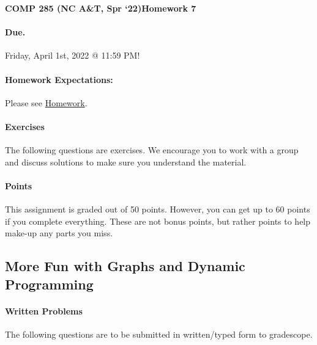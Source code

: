 \documentclass [12pt]{article}
\begin{document}
 

{\LARGE \textbf {COMP 285 (NC A\&T, Spr `22)}\hfill \textbf {Homework 7} } 
\vspace {1em} 
\begin{Instruction} 

\paragraph {Due.} Friday, April 1st, 2022 @ 11:59 PM!
\end{Instruction} 

\vspace {1em} 
\begin{Instruction} \paragraph {Homework Expectations:} Please see \href{https://www.comp285.ml/homework/#general-homework-information}{Homework}.
\end{Instruction}

\vspace {1em} 
\begin{Instruction} 

\paragraph {Exercises} The following questions are exercises. We encourage you to work with a group and discuss solutions to make sure you understand the material.

\paragraph {Points} This assignment is graded out of 50 points. However, you can get up to 60 points if you complete everything. These are not bonus points, but rather points to help make-up any parts you miss.

\end{Instruction} 

\begin{centering}
\section*{More Fun with Graphs and Dynamic Programming}
\end{centering}

\begin{Instruction}

\paragraph{Written Problems} The following questions are to be submitted in written/typed form to gradescope.

\end{Instruction}
\end{document}

